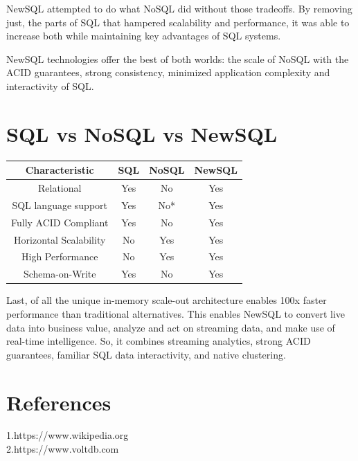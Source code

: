 \documentclass[12pt]{article}
\begin{document}
NewSQL attempted to do what NoSQL did without those tradeoffs. By removing just, the parts of SQL that hampered scalability and performance, it was able to increase both while maintaining key advantages of SQL systems.

NewSQL technologies offer the best of both worlds: the scale of NoSQL with the ACID guarantees, strong consistency, minimized application complexity and interactivity of SQL.
\section{SQL vs NoSQL vs NewSQL}
\begin{table}[htbp]
\footnotesize
\centering
\begin{tabulary}{\linewidth}{|C | C | C | C |}
\hline 
{} Characteristic 
&  SQL &  NoSQL 
&   NewSQL\\

\hline
Relational &  Yes & No & Yes \\
\hline
SQL language support &  Yes & No* & Yes \\
\hline
Fully ACID Compliant &  Yes &  No & Yes \\
\hline
Horizontal Scalability  & No & Yes & Yes \\
\hline
High Performance  & No & Yes & Yes \\
\hline
Schema-on-Write &  Yes & No & Yes \\

\hline
\end{tabulary}
\label{tab:team}
\end{table}

Last, of all the unique in-memory scale-out architecture enables 100x faster performance than traditional alternatives. This enables NewSQL to convert live data into business value, analyze and act on streaming data, and make use of real-time intelligence. So, it combines streaming analytics, strong ACID guarantees, familiar SQL data interactivity, and native clustering.
\section{References }
1.https://www.wikipedia.org \\
2.https://www.voltdb.com
\end{document}
